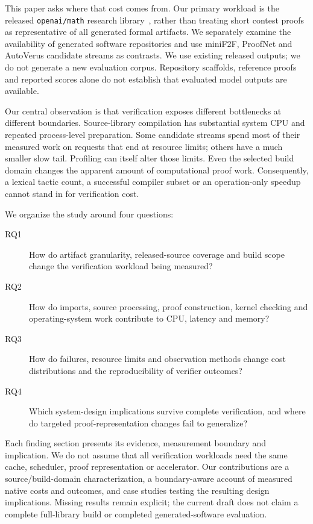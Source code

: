 \documentclass[10pt,twocolumn]{article}
\begin{document}
This paper asks where that cost comes from.
Our primary workload is the released \texttt{openai/math} research
library~\cite{openaiMathSource}, rather than treating short contest proofs as
representative of all generated formal artifacts.
We separately examine the availability of generated software repositories
and use miniF2F, ProofNet and AutoVerus candidate streams as contrasts.
We use existing released outputs; we do not generate a new evaluation corpus.
Repository scaffolds, reference proofs and reported scores alone do not
establish that evaluated model outputs are available.

Our central observation is that verification exposes different bottlenecks
at different boundaries. Source-library compilation has substantial system
CPU and repeated process-level preparation. Some candidate streams spend
most of their measured work on requests that end at resource limits; others
have a much smaller slow tail. Profiling can itself alter those limits.
Even the selected build domain changes the apparent amount of computational
proof work. Consequently, a lexical tactic count, a successful compiler
subset or an operation-only speedup cannot stand in for verification cost.

We organize the study around four questions:
\begin{description}
\item[RQ1] How do artifact granularity, released-source coverage and build
scope change the verification workload being measured?
\item[RQ2] How do imports, source processing, proof construction, kernel
checking and operating-system work contribute to CPU, latency and memory?
\item[RQ3] How do failures, resource limits and observation methods change
cost distributions and the reproducibility of verifier outcomes?
\item[RQ4] Which system-design implications survive complete verification,
and where do targeted proof-representation changes fail to generalize?
\end{description}

Each finding section presents its evidence, measurement boundary and
implication. We do not assume that all verification workloads need the same
cache, scheduler, proof representation or accelerator.
Our contributions are a source/build-domain characterization, a
boundary-aware account of measured native costs and outcomes, and
case studies testing the resulting design implications.
Missing results remain explicit; the current draft does not claim a
complete full-library build or completed generated-software evaluation.
\end{document}
